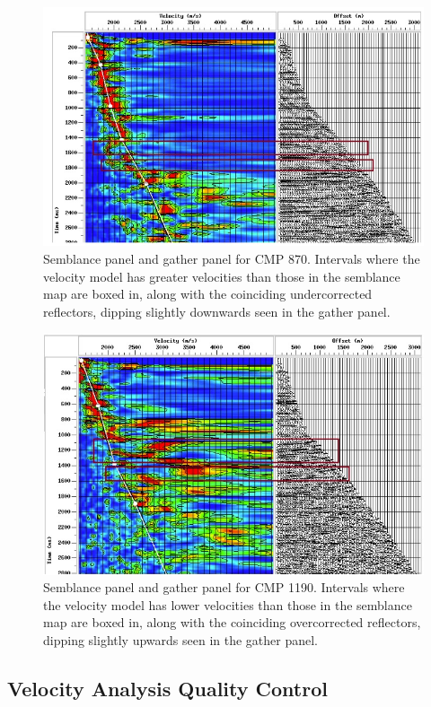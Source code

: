 \documentclass[10pt,a4paper]{article}
\begin{document}
\begin{figure}[H]
\includegraphics[width=\textwidth]{Velo_anal_example_870.jpg}
\caption{Semblance panel and gather panel for CMP 870. Intervals where the velocity model has greater velocities than those in the semblance map are boxed in, along with the coinciding undercorrected reflectors, dipping slightly downwards seen in the gather panel.}
\label{VA870ex}
\end{figure}

\begin{figure}[H]
\includegraphics[width=\textwidth]{Velo_anal_example_1190.jpg}
\caption{Semblance panel and gather panel for CMP 1190. Intervals where the velocity model has lower velocities than those in the semblance map are boxed in, along with the coinciding overcorrected reflectors, dipping slightly upwards seen in the gather panel.}
\label{VA1190ex}
\end{figure}

\subsection{Velocity Analysis Quality Control}
\end{document}
